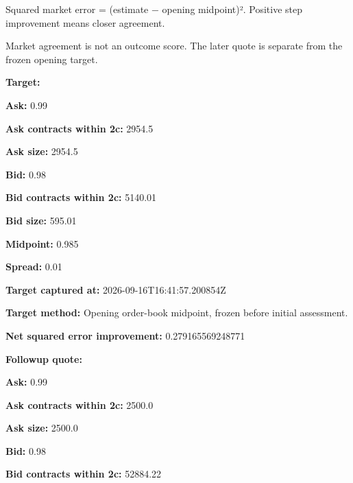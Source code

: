 \documentclass[11pt]{article}
\begin{document}
Squared market error = (estimate − opening midpoint)². Positive step improvement means closer agreement.


Market agreement is not an outcome score. The later quote is separate from the frozen opening target.


\par\noindent\textbf{Target:} \par \par\noindent\textbf{Ask:} 0.99

\par\noindent\textbf{Ask contracts within 2c:} 2954.5

\par\noindent\textbf{Ask size:} 2954.5

\par\noindent\textbf{Bid:} 0.98

\par\noindent\textbf{Bid contracts within 2c:} 5140.01

\par\noindent\textbf{Bid size:} 595.01

\par\noindent\textbf{Midpoint:} 0.985

\par\noindent\textbf{Spread:} 0.01

\par\noindent\textbf{Target captured at:} 2026-09-16T16:41:57.200854Z

\par\noindent\textbf{Target method:} Opening order-book midpoint, frozen before initial assessment.

\par\noindent\textbf{Net squared error improvement:} 0.279165569248771

\par\noindent\textbf{Followup quote:} \par \par\noindent\textbf{Ask:} 0.99

\par\noindent\textbf{Ask contracts within 2c:} 2500.0

\par\noindent\textbf{Ask size:} 2500.0

\par\noindent\textbf{Bid:} 0.98

\par\noindent\textbf{Bid contracts within 2c:} 52884.22
\end{document}
